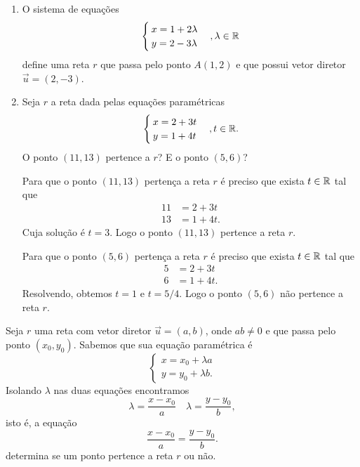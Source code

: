 \begin{exemplos}
    \begin{enumerate}
        \item O sistema de equações
              \[
                  \begin{cases}
                      x = 1 + 2\lambda \\
                      y = 2 - 3\lambda
                  \end{cases}, \lambda \in \mathbb{R}
              \]
              define uma reta $r$ que passa pelo ponto $A(1,2)$ e que possui vetor diretor $\vec{u} = (2, -3)$.
        \item Seja $r$ a reta dada pelas equações paramétricas
              \[
                  \begin{cases}
                      x = 2 + 3t \\
                      y = 1 + 4t
                  \end{cases}, t\in \mathbb{R}.
              \]
              O ponto $(11, 13)$ pertence a $r$? E o ponto $(5,6)$?
              \begin{solucao}
                  Para que o ponto $(11,13)$ pertença a reta $r$ é preciso que exista $t \in \mathbb{R}$ tal que
                  \begin{align*}
                      11 & = 2 + 3t  \\
                      13 & = 1 + 4t.
                  \end{align*}
                  Cuja solução é $t = 3$. Logo o ponto $(11,13)$ pertence a reta $r$.

                  Para que o ponto $(5,6)$ pertença a reta $r$ é preciso que exista $t \in \mathbb{R}$ tal que
                  \begin{align*}
                      5 & = 2 + 3t  \\
                      6 & = 1 + 4t.
                  \end{align*}
                  Resolvendo, obtemos $t = 1$ e $t = 5/4$. Logo o ponto $(5,6)$ não pertence a reta $r$.
              \end{solucao}
    \end{enumerate}
\end{exemplos}

Seja $r$ uma reta com vetor diretor $\vec{u} = (a,b)$, onde $ab\ne 0$ e que passa pelo ponto $(x_0, y_0)$. Sabemos que sua equação paramétrica é
\[
    \begin{cases}
        x = x_0 + \lambda a \\
        y = y_0 + \lambda b.
    \end{cases}
\]
Isolando $\lambda$ nas duas equações encontramos
\[
    \lambda = \dfrac{x - x_0}{a}\quad \lambda = \dfrac{y - y_0}{b},
\]
isto é, a equação
\begin{equation}\label{equacao_simetrica_reta_plano}
    \dfrac{x - x_0}{a} = \dfrac{y - y_0}{b}.
\end{equation}
determina se um ponto pertence a reta $r$ ou não.

